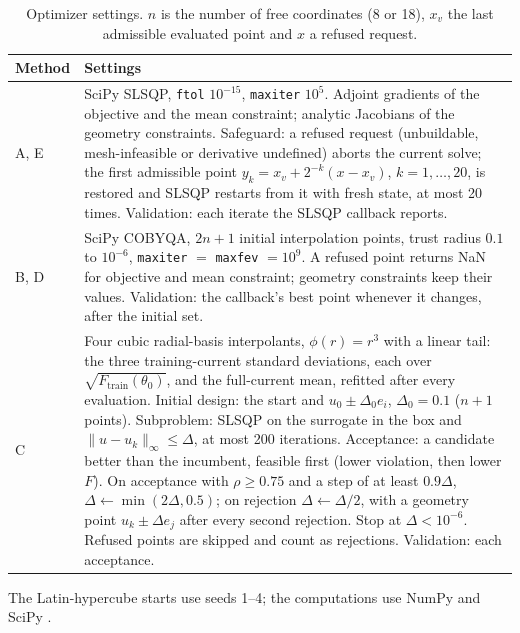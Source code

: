 \documentclass{anvil-paper}
\begin{document}
\begin{table}[H]\centering\small
\caption{Optimizer settings. $n$ is the number of free coordinates (8 or
18), $x_v$ the last admissible evaluated point and $x$ a refused request.}
\label{tab:settings}
\begin{tabular}{>{\raggedright\arraybackslash}p{.11\linewidth}>{\raggedright\arraybackslash}p{.83\linewidth}}\toprule
Method & Settings\\\midrule
A, E & SciPy SLSQP, \texttt{ftol} $10^{-15}$, \texttt{maxiter} $10^5$. Adjoint gradients of the objective and the mean constraint; analytic Jacobians of the geometry constraints. Safeguard: a refused request (unbuildable, mesh-infeasible or derivative undefined) aborts the current solve; the first admissible point $y_k=x_v+2^{-k}(x-x_v)$, $k=1,\ldots,20$, is restored and SLSQP restarts from it with fresh state, at most 20 times. Validation: each iterate the SLSQP callback reports.\\
B, D & SciPy COBYQA, $2n+1$ initial interpolation points, trust radius $0.1$ to $10^{-6}$, \texttt{maxiter} $=$ \texttt{maxfev} $=10^9$. A refused point returns NaN for objective and mean constraint; geometry constraints keep their values. Validation: the callback's best point whenever it changes, after the initial set.\\
C & Four cubic radial-basis interpolants, $\phi(r)=r^3$ with a linear tail: the three training-current standard deviations, each over $\sqrt{F_{\mathrm{train}}(\theta_0)}$, and the full-current mean, refitted after every evaluation. Initial design: the start and $u_0\pm\Delta_0e_i$, $\Delta_0=0.1$ ($n+1$ points). Subproblem: SLSQP on the surrogate in the box and $\|u-u_k\|_\infty\leq\Delta$, at most 200 iterations. Acceptance: a candidate better than the incumbent, feasible first (lower violation, then lower $F$). On acceptance with $\rho\geq0.75$ and a step of at least $0.9\Delta$, $\Delta\leftarrow\min(2\Delta,0.5)$; on rejection $\Delta\leftarrow\Delta/2$, with a geometry point $u_k\pm\Delta e_j$ after every second rejection. Stop at $\Delta<10^{-6}$. Refused points are skipped and count as rejections. Validation: each acceptance.\\
\bottomrule\end{tabular}
\end{table}

The Latin-hypercube starts \citep{mckay1979comparison} use seeds 1--4;
the computations use NumPy \citep{harris2020array} and SciPy
\citep{virtanen2020scipy}.
\end{document}
